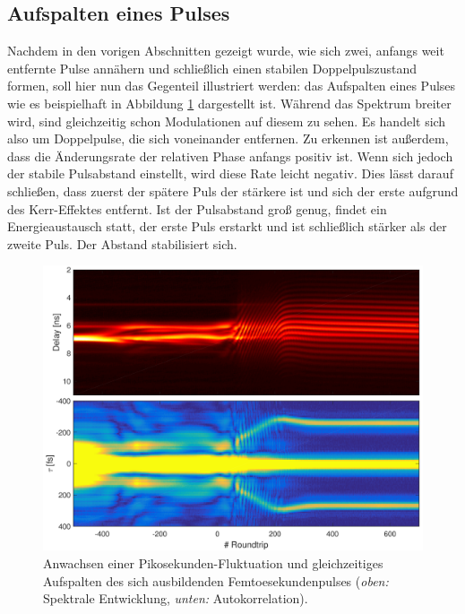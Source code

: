 \documentclass[bachelor,       %
               twoside,        %
               BCOR10mm,       %
               liststotoc,nomtotoc,bibtotoc, %
               english,ngerman, %
               final,          %
               ]{GAUBM}
\begin{document}
\clearpage
\subsection{Aufspalten eines Pulses}
Nachdem in den vorigen Abschnitten gezeigt wurde, wie sich zwei, anfangs weit entfernte Pulse annähern und schließlich einen stabilen Doppelpulszustand formen, soll hier nun das Gegenteil illustriert werden: das Aufspalten eines Pulses wie es beispielhaft in Abbildung \ref{fig:Splitting} dargestellt ist.
Während das Spektrum breiter wird, sind gleichzeitig schon Modulationen auf diesem zu sehen.
Es handelt sich also um Doppelpulse, die sich voneinander entfernen.
Zu erkennen ist außerdem, dass die Änderungsrate der relativen Phase anfangs positiv ist. Wenn sich jedoch der stabile Pulsabstand einstellt, wird diese Rate leicht negativ.
Dies lässt darauf schließen, dass zuerst der spätere Puls der stärkere ist und sich der erste aufgrund des Kerr-Effektes entfernt.
Ist der Pulsabstand groß genug, findet ein Energieaustausch statt, der erste Puls erstarkt und ist schließlich stärker als der zweite Puls.
Der Abstand stabilisiert sich.
\begin{figure}[!htb]
   \centering
   \includegraphics[width=\textwidth]{figures/4ms_25GSA_400m_Mlstart_Doppelpulse4_Splitting_93800}
   \caption{Anwachsen einer Pikosekunden-Fluktuation und gleichzeitiges Aufspalten des sich ausbildenden Femtoesekundenpulses (\textit{oben:} Spektrale Entwicklung, \textit{unten:} Autokorrelation).}
   \label{fig:Splitting}
\end{figure}
\end{document}
